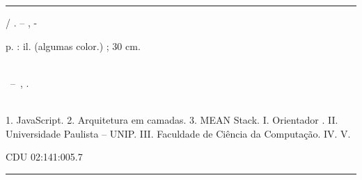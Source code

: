 \documentclass[
	12pt,				%
	openright,			%
	twoside,			%
	a4paper,			%
	english,			%
	brazil				%
	]{abntex2}
\begin{document}
\frenchspacing 


\imprimircapa

\imprimirfolhaderosto*


%
%     
\begin{fichacatalografica}
	\vspace*{\fill}					%
	\hrule							%
	\begin{center}					%
	\begin{minipage}[c]{12.5cm}		%
	
	\imprimirautor
	
	\hspace{0.5cm} \imprimirtitulo  / \imprimirautor. --
	\imprimirlocal, \imprimirdata-
	
	\hspace{0.5cm} \pageref{LastPage} p. : il. (algumas color.) ; 30 cm.\\
	
	\hspace{0.5cm} \imprimirorientadorRotulo~\imprimirorientador\\
	
	\hspace{0.5cm}
	\parbox[t]{\textwidth}{\imprimirtipotrabalho~--~\imprimirinstituicao,
	\imprimirdata.}\\
	
	\hspace{0.5cm}
		1. JavaScript.
        2. Arquitetura em camadas.
        3. MEAN Stack.
		I. Orientador \imprimirorientador.
		II. Universidade Paulista -- UNIP.
		III. Faculdade de Ciência da Computação.
		IV. \imprimirtitulo 
		V. \imprimirautor
	
	\hspace{8.75cm} CDU 02:141:005.7\\
	
	\end{minipage}
	\end{center}
	\hrule
\end{fichacatalografica}
\end{document}
